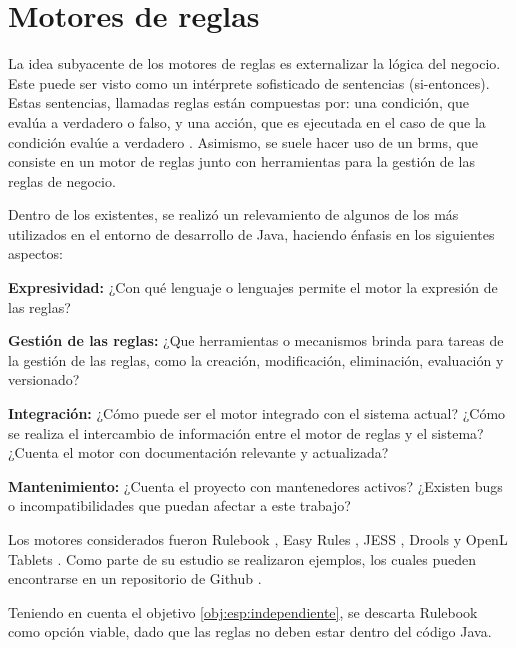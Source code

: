 \section{Motores de reglas}\label{sec:motores}

La idea subyacente de los motores de reglas es externalizar la lógica del negocio. 
Este puede ser visto como un intérprete sofisticado de sentencias  (si-entonces). Estas sentencias, llamadas reglas están compuestas por: una condición, que evalúa a verdadero o falso, y una acción, que es ejecutada en el caso de que la condición evalúe a verdadero \cite{qusay2005jsr94}.
Asimismo, se suele hacer uso de un \acrfull{brms}, que consiste en un motor de reglas junto con herramientas para la gestión de las reglas de negocio.


Dentro de los existentes, se realizó un relevamiento de algunos de los más utilizados en el entorno de desarrollo de Java, haciendo énfasis en los siguientes aspectos:
\begin{enumerate*}[label=(\alph*)]
    \item 
    \label{comp:expresividad}
    \textbf{Expresividad:}
    ¿Con qué lenguaje o lenguajes permite el motor la expresión de las reglas?
    \item 
    \label{comp:gestion}
    \textbf{Gestión de las reglas:}
    ¿Que herramientas o mecanismos brinda para tareas de la gestión de las reglas, como la creación, modificación, eliminación, evaluación y versionado?
    \item 
    \label{comp:integracion}
    \textbf{Integración:}
    ¿Cómo puede ser el motor integrado con el sistema actual? ¿Cómo se realiza el intercambio de información entre el motor de reglas y el sistema? ¿Cuenta el motor con documentación relevante y actualizada?
    \item 
    \label{comp:mantenimiento}
    \textbf{Mantenimiento:}
    ¿Cuenta el proyecto con mantenedores activos? ¿Existen bugs o incompatibilidades que puedan afectar a este trabajo?
\end{enumerate*}

Los motores considerados fueron Rulebook \cite{rulebook}, Easy Rules \cite{easy-rules}, JESS \cite{jess}, Drools \cite{drools} y OpenL Tablets \cite{openl}.
Como parte de su estudio se realizaron ejemplos, los cuales pueden encontrarse en un repositorio de Github \cite{ejemplos}.

Teniendo en cuenta el objetivo \ref{obj:esp:independiente}, se descarta Rulebook como opción viable, dado que las reglas no deben estar dentro del código Java.

